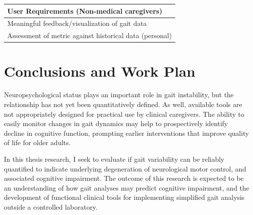 \documentclass[11pt, oneside]{report}   	%
\begin{document}
\begin{table}
\begin{tabular}{p{\textwidth}}
	\textbf{User Requirements (Non-medical caregivers)} \\ \hline
	Meaningful feedback/visualization of gait data \\ \hline 
	Assessment of metric against historical data (personal) \\ \hline 
	
  \end{tabular}
\end{table}


\section*{Conclusions and Work Plan}

Neuropsychological status plays an important role in gait instability, but the relationship has not yet been quantitatively defined. As well, available tools are not appropriately designed for practical use by clinical caregivers. The ability to easily monitor changes in gait dynamics may help to prospectively identify decline in cognitive function, prompting earlier interventions that improve quality of life for older adults.

In this thesis research, I seek to evaluate if gait variability can be reliably quantified to indicate underlying degeneration of neurological motor control, and associated cognitive impairment. The outcome of this research is expected to be an understanding of how gait analyses may predict cognitive impairment, and the development of functional clinical tools for implementing simplified gait analysis outside a controlled laboratory.

\pagebreak

\end{document}
